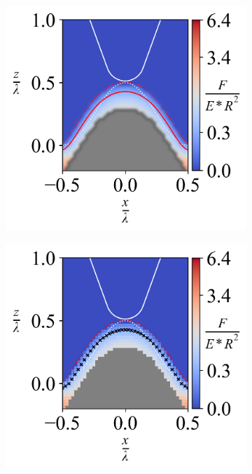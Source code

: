 \begin{figure}[H]
    
    \begin{subfigure}{0.32\textwidth}
        \centering
        \caption{\label{fig: All-Wave-ContourPlot-3}}
        \includegraphics[width=1\linewidth]{Figures/Wave-ContourPlot-3.png}
    \end{subfigure}
    \hfill
    \begin{subfigure}{0.32\textwidth}
        \centering
        \caption{\label{fig: All-Wave-ContourPlotNI-3}}
        \includegraphics[width=1\linewidth]{Figures/Wave-ContourPlotNI-3.png}

\end{subfigure}
\end{figure}
